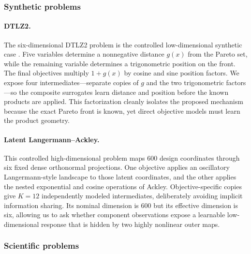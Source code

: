 \documentclass{article}
\begin{document}
\subsubsection{Synthetic problems}

\paragraph{DTLZ2.}
The six-dimensional DTLZ2 problem is the controlled low-dimensional synthetic
case \cite{deb2002scalable}.  Five variables determine a nonnegative distance
$g(x)$ from the Pareto set, while the remaining variable determines a
trigonometric position on the front.  The final objectives multiply $1+g(x)$
by cosine and sine position factors.  We expose four intermediates---separate
copies of $g$ and the two trigonometric factors---so the composite surrogates
learn distance and position before the known products are applied.  This
factorization cleanly isolates the proposed mechanism because the exact Pareto
front is known, yet direct objective models must learn the product geometry.

\paragraph{Latent Langermann--Ackley.}
This controlled high-dimensional problem maps 600 design coordinates through
six fixed dense orthonormal projections.  One objective applies an oscillatory
Langermann-style landscape to those latent coordinates, and the other applies
the nested exponential and cosine operations of Ackley.  Objective-specific
copies give $K=12$ independently modeled intermediates, deliberately avoiding
implicit information sharing.  Its nominal dimension is 600 but its effective
dimension is six, allowing us to ask whether component observations expose a
learnable low-dimensional response that is hidden by two highly nonlinear
outer maps.

\subsubsection{Scientific problems}
\end{document}
